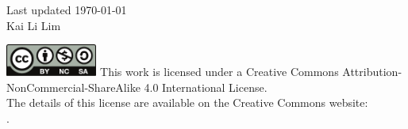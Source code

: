 
\begin{dedication} 
	\vspace*{\fill}
	\flushleft
	Last updated \today\\
	\bigskip
	\textcopyright \the\year \hspace{3pt} Kai Li Lim\\
	
	\begin{minipage}{0.8\linewidth}
		\small
		\raggedright
		\singlespacing
		\includegraphics[width=3cm]{Copyright/by-nc-sa}\newline
		This work is licensed under a Creative Commons Attribution-NonCommercial-ShareAlike 4.0 International License.\\
		The details of this license are available on the Creative Commons website:\\
		{}.
	\end{minipage}
\end{dedication}



%
%
%

